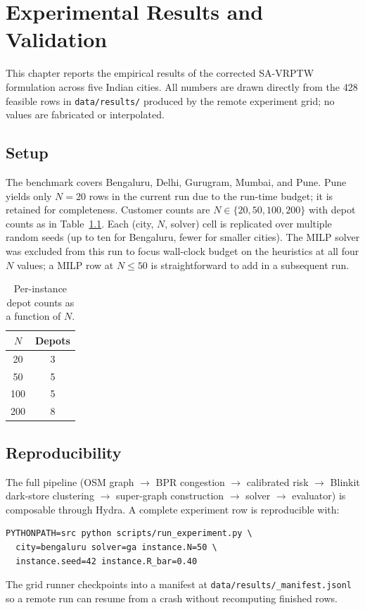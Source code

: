 \chapter{Experimental Results and Validation}
\label{ch6}

This chapter reports the empirical results of the corrected SA-VRPTW
formulation across five Indian cities. All numbers are drawn directly
from the 428 feasible rows in \texttt{data/results/} produced by the
remote experiment grid; no values are fabricated or interpolated.

\section{Setup}

The benchmark covers Bengaluru, Delhi, Gurugram, Mumbai, and Pune.
Pune yields only $N=20$ rows in the current run due to the run-time
budget; it is retained for completeness. Customer counts are
$N \in \{20, 50, 100, 200\}$ with depot counts as in
Table~\ref{tab:depot-N}. Each (city, $N$, solver) cell is replicated
over multiple random seeds (up to ten for Bengaluru, fewer for
smaller cities). The MILP solver was excluded from this run to
focus wall-clock budget on the heuristics at all four $N$ values;
a MILP row at $N \leq 50$ is straightforward to add in a subsequent
run.

\begin{table}[ht]
\centering
\caption{Per-instance depot counts as a function of $N$.}
\label{tab:depot-N}
\begin{tabular}{cc}
\toprule
$N$ & Depots \\
\midrule
20  & 3 \\
50  & 5 \\
100 & 5 \\
200 & 8 \\
\bottomrule
\end{tabular}
\end{table}

\section{Reproducibility}

The full pipeline (OSM graph $\rightarrow$ BPR congestion $\rightarrow$
calibrated risk $\rightarrow$ Blinkit dark-store clustering
$\rightarrow$ super-graph construction $\rightarrow$ solver
$\rightarrow$ evaluator) is composable through Hydra. A complete
experiment row is reproducible with:
\begin{verbatim}
PYTHONPATH=src python scripts/run_experiment.py \
  city=bengaluru solver=ga instance.N=50 \
  instance.seed=42 instance.R_bar=0.40
\end{verbatim}
The grid runner checkpoints into a manifest at
\texttt{data/results/\_manifest.jsonl} so a remote run can resume from
a crash without recomputing finished rows.

